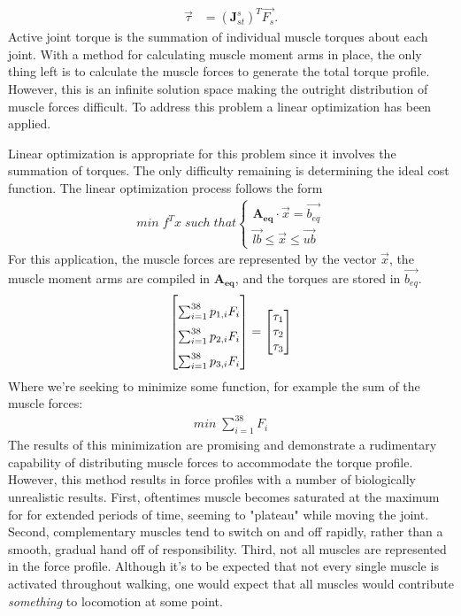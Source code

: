 \documentclass[runningheads,a4paper]{llncs}
\begin{document}
			\begin{align*}
				\overrightarrow{\tau} &= (\textbf{J}^{s}_{st})^{T}\overrightarrow{F_{s}}.
			\end{align*}
		Active joint torque is the summation of individual muscle torques about each joint. With a method for calculating muscle moment arms in place, the only thing left is to calculate the muscle forces to generate the total torque profile. However, this is an infinite solution space making the outright distribution of muscle forces difficult. To address this problem a linear optimization has been applied. \par
		Linear optimization is appropriate for this problem since it involves the summation of torques. The only difficulty remaining is determining the ideal cost function. The linear optimization process follows the form
			\begin{align*}
				min\;f^{T} x\;such\;that 
				\begin{cases} 
				 	\mathbf{A_{eq}} \cdot \overrightarrow{x} = \overrightarrow{b_{eq}} \\
					\overrightarrow{lb} \leq \overrightarrow{x} \leq \overrightarrow{ub} 
				\end{cases}
			\end{align*}
		For this application, the muscle forces are represented by the vector $\overrightarrow{x}$, the muscle moment arms are compiled in $\mathbf{A_{eq}}$, and the torques are stored in $\overrightarrow{b_{eq}}$. 
			\begin{align*}
				{\setlength\extrarowheight{8pt}\begin{bmatrix}
					\sum_{i=1}^{38} p_{1,i} F_{i} \\
					\sum_{i=1}^{38} p_{2,i} F_{i} \\
					\sum_{i=1}^{38} p_{3,i} F_{i}
				\end{bmatrix}} =
				\begin{bmatrix}
					\tau_{1} \\
					\tau_{2} \\
					\tau_{3}
				\end{bmatrix}
			\end{align*}
		Where we're seeking to minimize some function, for example the sum of the muscle forces:
			\begin{align*}
				min\;\sum_{i=1}^{38} F_{i} 
			\end{align*}
		The results of this minimization are promising and demonstrate a rudimentary capability of distributing muscle forces to accommodate the torque profile. However, this method results in force profiles with a number of biologically unrealistic results. First, oftentimes muscle becomes saturated at the maximum for for extended periods of time, seeming to "plateau" while moving the joint. Second, complementary muscles tend to switch on and off rapidly, rather than a smooth, gradual hand off of responsibility. Third, not all muscles are represented in the force profile. Although it's to be expected that not every single muscle is activated throughout walking, one would expect that all muscles would contribute \textit{something} to locomotion at some point. 
		
	 
	
		
\end{document}
